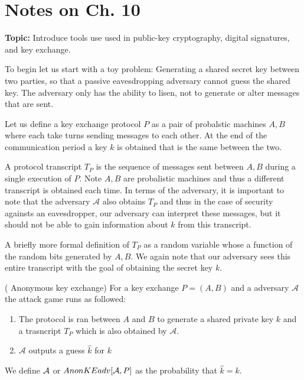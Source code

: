 \chapter{Notes on Ch. 10}

\textbf{Topic:} Introduce tools use used in public-key cryptography, digital signatures, and key exchange.\\
\vspace{1em}

To begin let us start with a toy problem: Generating a 
shared secret key between two parties, so that a passive eavesdropping adversary cannot guess the shared key. The adversary only has the ability to lisen, not to generate or alter messages that are sent. 

Let us define a key exchange protocol \(P\) as a pair of probalstic machines \(A,B\)  where each take turns sending messages to each other. At the end of the communication period a key \(k\)  is obtained that is the same between the two. 

A protocol transcript \(T_P\) is the sequence of messages sent between \(A,B\) during a single execution of \(P\). Note \(A,B\) are probalistic machines and thus a different transcript is obtained each time. In terms of the adversary, it is important to note that the adversary \(\mathcal{A}\) also obtains \(T_P\) and thus in the case of security againsts an eavesdropper, our adversary can interpret these messages, but it should not be able to gain information about \(k\) from this transcript. 

A briefly more formal definition of \(T_P\) as a random variable whose a function of the random bits generated by \(A,B\). We again note that our adversary sees this entire transcript with the goal of obtaining the secret key \(k\). 

\begin{attackGame}( Anonymous key exchange)
For a key exchange \(P=(A,B)\) and a adversary \(\mathcal{A}\) the attack game runs as followed:
\begin{enumerate}
    \item The protocol is ran between \(A\) and \(B\) to generate a shared private key \(k\) and a trasncript \(T_P\) which is also obtained by \(\mathcal{A}\). 
    \item \(\mathcal{A}\) outputs a guess \(\hat{k}\) for \(k\)       
\end{enumerate}

We define \(\mathcal{A}\) or \(AnonKEadv[\mathcal{A}, P]\) as the probability that \(\hat{k} = k\). 
\end{attackGame}

